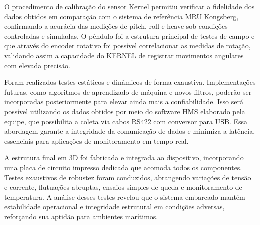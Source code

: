 \documentclass[a4paper, 12pt]{article}
\begin{document}
    O procedimento de calibração do sensor Kernel permitiu verificar a fidelidade dos dados obtidos em comparação com o sistema de referência MRU Kongsberg, confirmando a acurácia das medições de pitch, roll e heave sob condições controladas e simuladas. O pêndulo foi a estrutura principal de testes de campo e que através do encoder rotativo foi possível correlacionar as medidas de rotação, validando assim a capacidade do KERNEL de registrar movimentos angulares com elevada precisão. 
    
    Foram realizados testes estáticos e dinâmicos de forma exaustiva. Implementações futuras, como algoritmos de aprendizado de máquina e novos filtros, poderão ser incorporadas posteriormente para elevar ainda mais a confiabilidade. Isso será possível utilizando os dados obtidos por meio do software HMS elaborado pela equipe, que possibilita a coleta via cabos RS422 com conversor para USB. Essa abordagem garante a integridade da comunicação de dados e minimiza a latência, essenciais para aplicações de monitoramento em tempo real.
    
    A estrutura final em 3D foi fabricada e integrada ao dispositivo, incorporando uma placa de circuito impresso dedicada que acomoda todos os componentes. Testes exaustivos de robustez foram conduzidos, abrangendo variações de tensão e corrente, flutuações abruptas, ensaios simples de queda e monitoramento de temperatura. A análise desses testes revelou que o sistema embarcado mantém estabilidade operacional e integridade estrutural em condições adversas, reforçando sua aptidão para ambientes marítimos. 

    
\newpage

\end{document}
